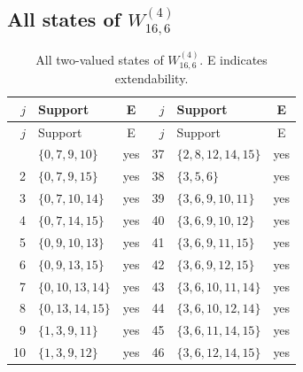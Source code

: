 \documentclass[aps,pra,reprint,superscriptaddress,longbibliography,nofootinbib,floatfix,10pt]{revtex4-2}
\theoremstyle{definition}
\begin{document}
\subsection{All states of \texorpdfstring{$W_{16,6}^{(4)}$}{gadget 4b}}
\begingroup\footnotesize\setlength{\tabcolsep}{3pt}\setlength{\LTpre}{5pt}\setlength{\LTpost}{8pt}
\begin{longtable}{rlc@{\qquad}rlc}
\caption{All two-valued states of $W_{16,6}^{(4)}$. E indicates extendability.}\label{tab:states-4b}\\\toprule $j$ & Support & E & $j$ & Support & E\\\midrule\endfirsthead
\toprule $j$ & Support & E & $j$ & Support & E\\\midrule\endhead\bottomrule\endfoot
1 & $\{0,\allowbreak 7,\allowbreak 9,\allowbreak 10\}$ & yes & 37 & $\{2,\allowbreak 8,\allowbreak 12,\allowbreak 14,\allowbreak 15\}$ & yes\\
2 & $\{0,\allowbreak 7,\allowbreak 9,\allowbreak 15\}$ & yes & 38 & $\{3,\allowbreak 5,\allowbreak 6\}$ & yes\\
3 & $\{0,\allowbreak 7,\allowbreak 10,\allowbreak 14\}$ & yes & 39 & $\{3,\allowbreak 6,\allowbreak 9,\allowbreak 10,\allowbreak 11\}$ & yes\\
4 & $\{0,\allowbreak 7,\allowbreak 14,\allowbreak 15\}$ & yes & 40 & $\{3,\allowbreak 6,\allowbreak 9,\allowbreak 10,\allowbreak 12\}$ & yes\\
5 & $\{0,\allowbreak 9,\allowbreak 10,\allowbreak 13\}$ & yes & 41 & $\{3,\allowbreak 6,\allowbreak 9,\allowbreak 11,\allowbreak 15\}$ & yes\\
6 & $\{0,\allowbreak 9,\allowbreak 13,\allowbreak 15\}$ & yes & 42 & $\{3,\allowbreak 6,\allowbreak 9,\allowbreak 12,\allowbreak 15\}$ & yes\\
7 & $\{0,\allowbreak 10,\allowbreak 13,\allowbreak 14\}$ & yes & 43 & $\{3,\allowbreak 6,\allowbreak 10,\allowbreak 11,\allowbreak 14\}$ & yes\\
8 & $\{0,\allowbreak 13,\allowbreak 14,\allowbreak 15\}$ & yes & 44 & $\{3,\allowbreak 6,\allowbreak 10,\allowbreak 12,\allowbreak 14\}$ & yes\\
9 & $\{1,\allowbreak 3,\allowbreak 9,\allowbreak 11\}$ & yes & 45 & $\{3,\allowbreak 6,\allowbreak 11,\allowbreak 14,\allowbreak 15\}$ & yes\\
10 & $\{1,\allowbreak 3,\allowbreak 9,\allowbreak 12\}$ & yes & 46 & $\{3,\allowbreak 6,\allowbreak 12,\allowbreak 14,\allowbreak 15\}$ & yes\\

\end{longtable}
\end{document}
